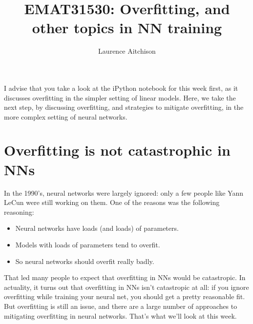 \documentclass{article}
\title{EMAT31530: Overfitting, and other topics in NN training}
\author{Laurence Aitchison}
\date{}
\newcommand{\0}{\mathbf{0}}
\begin{document}
\maketitle

I advise that you take a look at the iPython notebook for this week first, as it discusses overfitting in the simpler setting of linear models.  
Here, we take the next step, by discussing overfitting, and strategies to mitigate overfitting, in the more complex setting of neural networks.

\section{Overfitting is not catastrophic in NNs}

In the 1990's, neural networks were largely ignored: only a few people like Yann LeCun were still working on them.
One of the reasons was the following reasoning:
\begin{itemize}
  \item Neural networks have loads (and loads) of parameters.
  \item Models with loads of parameters tend to overfit.
  \item So neural networks should overfit really badly.
\end{itemize}
That led many people to expect that overfitting in NNs would be catastropic.
In actuality, it turns out that overfitting in NNs isn't catastropic at all: if you ignore overfitting while training your neural net, you should get a pretty reasonable fit.
But overfitting is still an issue, and there are a large number of approaches to mitigating overfitting in neural networks.
That's what we'll look at this week.


\newpage
\end{document}
